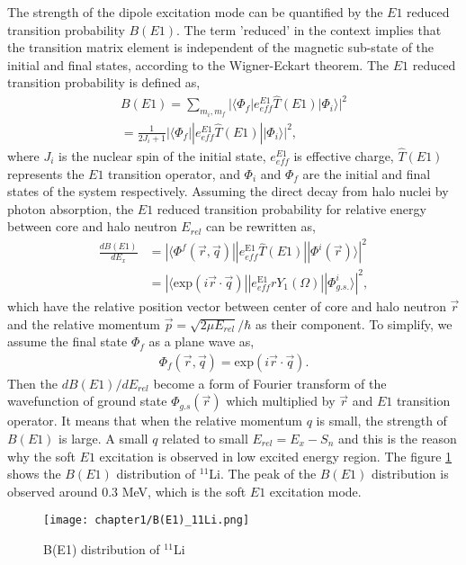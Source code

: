 The strength of the dipole excitation mode can be quantified by the $E1$ reduced transition probability $B(E1)$. The term 'reduced' in the context implies that the transition matrix element is independent of the magnetic sub-state of the initial and final states, according to the Wigner-Eckart theorem. The $E1$ reduced transition probability is defined as,
\begin{align}
    B(E1) = \sum_{m_i, m_f}|\langle \Phi_f |e_{eff}^{E1}\hat{T}(E1)| \Phi_i \rangle|^2 \\
    = \frac{1}{2J_i+1} |\langle \Phi_f ||e_{eff}^{E1}\hat{T}(E1)|| \Phi_i \rangle|^2, 
\end{align}
where $J_i$ is the nuclear spin of the initial state, $e_{eff}^{E1}$ is effective charge, $\hat{T}(E1)$ represents the $E1$ transition operator, and $\Phi_i$ and $\Phi_f$ are the initial and final states of the system respectively.
Assuming the direct decay from halo nuclei by photon absorption, the $E1$ reduced transition probability for relative energy between core and halo neutron $E_{rel}$ can be rewritten as,
\begin{align}
    \frac{dB(E1)}{dE_x} &= |\langle \Phi^f(\vec{r},\vec{q}) ||e_{eff}^{\text{E1}}\hat{T}(E1)|| \Phi^i(\vec{r})\rangle|^2 \\
                        &= |\langle \text{exp}(i\vec{r}\cdot\vec{q}) ||e_{eff}^{\text{E1}}rY_{1}(\Omega)|| \Phi^i_{g.s.}\rangle|^2,
\end{align}
which have the relative position vector between center of core and halo neutron $\vec{r}$ and the relative momentum $\vec{p} = \sqrt{2\mu E_{rel}}/\hbar$ as their component. To simplify, we assume the final state $\Phi_f$ as a plane wave as,
\begin{align}
    \Phi_f(\vec{r},\vec{q}) = \text{exp}(i\vec{r}\cdot\vec{q}).
\end{align}
Then the $dB(E1)/dE_{rel}$ become a form of Fourier transform of the wavefunction of ground state $\Phi_{g.s}(\vec{r})$ which multiplied by $\vec{r}$ and $E1$ transition operator. It means that when the relative momentum $q$ is small, the strength of $B(E1)$ is large. A small $q$ related to small $E_{rel} = E_x - S_n$ and this is the reason why the soft $E1$ excitation is observed in low excited energy region. The figure \ref{fig:Coulomb_dissociation} shows the $B(E1)$ distribution of $^{11}$Li. The peak of the $B(E1)$ distribution is observed around 0.3 MeV, which is the soft $E1$ excitation mode.

\begin{figure}
    \centering
    \texttt{[image: chapter1/B(E1)\_11Li.png]}
    \caption{B(E1) distribution of $^{11}$Li \cite{Nakamura06}}
    \label{fig:Coulomb_dissociation}
\end{figure}

